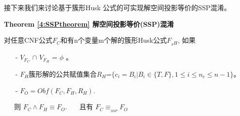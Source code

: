 %
%
接下来我们来讨论基于簇形Husk 公式的可实现解空间投影等价的SSP混淆。

\textbf{Theorem \ref{4:SSPtheorem} 解空间投影等价(SSP)混淆}

对任意CNF公式$F_C$和有n个变量m个解的簇形Husk公式$F_{_SH}$, 如果
\begin{enumerate}
 \item[-] $V_{F_C}$ $\cap$ $V_{F_H}$ = $\phi$ 。
 \item[-] $F_H$簇形解的公共赋值集合$R_H$=$\{c_i=B_i| B_i \in \{T,F\}, 1\leqslant i\leqslant n_c \leqslant n-1 \}$。
 \item[-] $F_O=Obf(F_C,F_H,R_H)$.
\end{enumerate}
~~~则 $F_C\wedge F_H \equiv F_O$.
~~~且有 $F_C \equiv_{_{SSP}} F_O$

